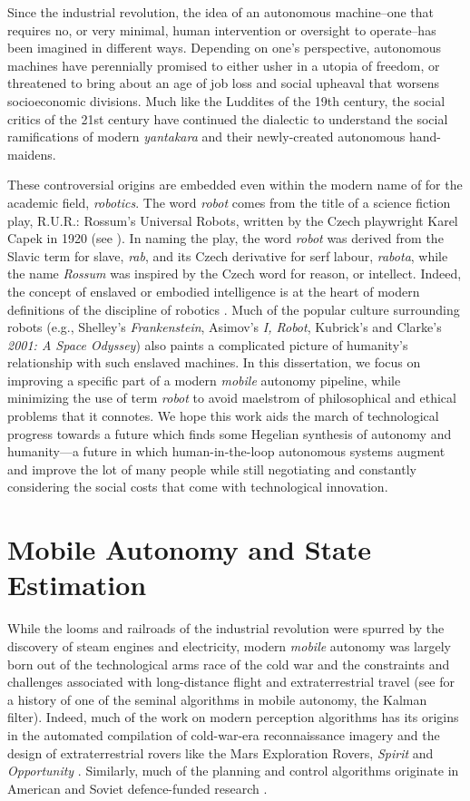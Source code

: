 Since the industrial revolution, the idea of an autonomous machine--one that requires no, or very minimal, human intervention or oversight to operate--has been imagined in different ways. Depending on one's perspective, autonomous machines have perennially promised to either usher in a utopia of freedom, or threatened to bring about an age of job loss and social upheaval that worsens socioeconomic divisions. Much like the Luddites of the 19th century, the social critics of the 21st century have continued the dialectic to understand the social ramifications of modern \textit{yantakara} and their newly-created autonomous hand-maidens.

These controversial origins are embedded even within the modern name of for the academic field, \textit{robotics}. The word \textit{robot} comes from the title of a science fiction play, R.U.R.: Rossum's Universal Robots, written by the Czech playwright Karel Capek in 1920 (see ). In naming the play, the word \textit{robot} was derived from the Slavic term for slave, \textit{rab}, and its Czech derivative for serf labour, \textit{rabota}, while the name \textit{Rossum} was inspired by the Czech word for reason, or intellect. Indeed, the concept of enslaved or embodied  intelligence is at the heart of modern definitions of the discipline of robotics \citep{Redfield2019-pi}. Much of the popular culture surrounding robots (e.g., Shelley's \textit{Frankenstein}, Asimov's \textit{I, Robot}, Kubrick's and Clarke's \textit{2001: A Space Odyssey}) also paints a complicated picture of humanity's relationship with such enslaved machines. In this dissertation, we focus on improving a specific part of a modern \textit{mobile} autonomy pipeline, while minimizing the use of term \textit{robot} to avoid maelstrom of philosophical and ethical problems that it connotes. We hope this work aids the march of technological progress towards a future which finds some Hegelian synthesis of autonomy and humanity---a future in which human-in-the-loop autonomous systems augment and improve the lot of many people while still negotiating and constantly considering the social costs that come with technological innovation.

\section{Mobile Autonomy and State Estimation}
While the looms and railroads of the industrial revolution were spurred by the discovery of steam engines and electricity, modern \textit{mobile} autonomy was largely born out of the technological arms race of the cold war and the constraints and challenges associated with long-distance flight and extraterrestrial travel (see \cite{Grewal2010-ts} for a history of one of the seminal algorithms in mobile autonomy, the Kalman filter). Indeed, much of the work on modern perception algorithms has its origins in the automated compilation of cold-war-era reconnaissance imagery and the design of extraterrestrial rovers like the Mars Exploration Rovers, \textit{Spirit} and \textit{Opportunity} \citep{Scaramuzza2011-qr}. Similarly, much of the planning and control algorithms originate in American and Soviet defence-funded research \citep{Nilsson1984-oc,Thrun2006-hb}.

